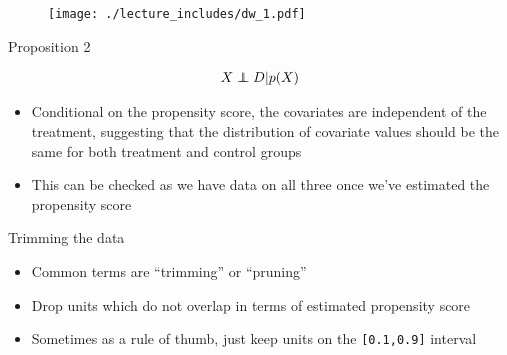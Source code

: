 \documentclass{beamer}
\newcommand\independent{\protect\mathpalette{\protect\independenT}{\perp}}
\def\independenT#1#2{\mathrel{\rlap{$#1#2$}\mkern2mu{#1#2}}}
\begin{document}
\begin{frame}[plain]
	
\begin{figure}
\texttt{[image: ./lecture\_includes/dw\_1.pdf]}
\end{figure}

\end{frame}


\begin{frame}{Proposition 2}
	
	\begin{eqnarray*}
	X \independent D | p(X)
	\end{eqnarray*}
	
	\begin{itemize}
	\item Conditional on the propensity score, the covariates are independent of the treatment, suggesting that the distribution of covariate values should be the same for both treatment and control groups
	\item This can be checked as we have data on all three once we've estimated the propensity score
	\end{itemize}

\end{frame}

\begin{frame}{Trimming the data}
	
	\begin{itemize}
	\item Common terms are ``trimming'' or ``pruning''
	\item Drop units which do not overlap in terms of estimated propensity score
	\item Sometimes as a rule of thumb, just keep units on the \texttt{[0.1,0.9]} interval
	\end{itemize}

\end{frame}







\clearpage
\newpage
\end{document}
